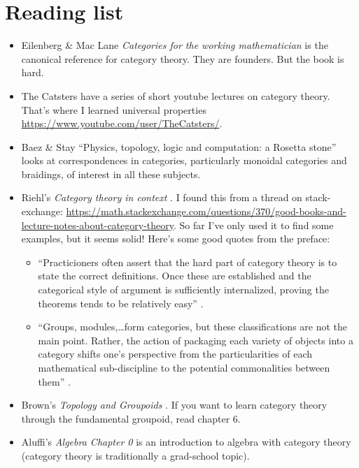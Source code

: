 \documentclass[a5paper]{scrartcl}
\def\book#1{\textit{#1}}
\begin{document}
\section{Reading list}
\begin{itemize}
  \item Eilenberg \& Mac Lane \book{Categories for the working mathematician} \cite{working} is the canonical reference for category theory. They are founders. But the book is hard.
  \item The Catsters have a series of short youtube lectures on category theory. That's where I learned universal properties \url{https://www.youtube.com/user/TheCatsters/}.
  \item Baez \& Stay ``Physics, topology, logic and computation: a Rosetta stone'' \cite{rosetta} looks at correspondences in categories, particularly monoidal categories and braidings, of interest in all these subjects.

  \item Riehl's \book{Category theory in context} \cite{cat-context}. I found this from a thread on stack-exchange:
        \url{https://math.stackexchange.com/questions/370/good-books-and-lecture-notes-about-category-theory}. So far I've only used it to find some examples, but it seems solid! Here's some good quotes from the preface:
        \begin{itemize}
          \item ``Practicioners often assert that the hard part of category theory is to state the correct definitions. Once these are established and the categorical style of argument is sufficiently internalized, proving the theorems tends to be relatively easy'' \cite[x]{cat-context}.

          \item ``Groups, modules,\dots form categories, but these classifications are not the main point. Rather, the action of packaging each variety of objects into a category shifts one's perspective from the particularities of each mathematical sub-discipline to the potential commonalities between them'' \cite[xi]{cat-context}.
        \end{itemize}
  \item Brown's \book{Topology and Groupoids} \cite{groupoid}. If you want to learn category theory through the fundamental groupoid, read chapter 6.

  \item Aluffi's \book{Algebra Chapter 0} is an introduction to algebra with category theory (category theory is traditionally a grad-school topic).


\end{itemize}
\end{document}
